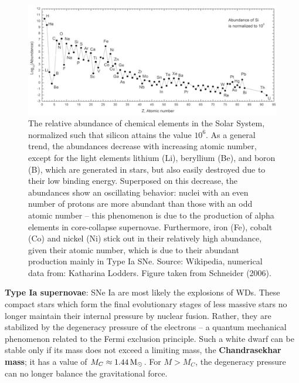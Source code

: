 \documentclass[a4paper,10pt]{article}
\begin{document}
\begin{figure}[t]
    \centering
    \includegraphics[width=12cm]{figures/ChemicalElements.png}
    \caption{\footnotesize{The relative abundance of chemical elements in the Solar System, normalized such that silicon attains the value $10^6$. As a general trend, the abundances decrease with increasing atomic number, except for the light elements lithium (Li), beryllium (Be), and boron (B), which are generated in stars, but also easily destroyed due to their low binding energy. Superposed on this decrease, the abundances show an oscillating behavior: nuclei with an even number of protons are more abundant than those with an odd atomic number -- this phenomenon is due to the production of alpha elements in core-collapse supernovae. Furthermore, iron (Fe), cobalt (Co) and nickel (Ni) stick out in their relatively high abundance, given their atomic number, which is due to their abundant production mainly in Type Ia SNe. Source: Wikipedia, numerical data from: Katharina Lodders. Figure taken from Schneider (2006).}}
    \label{fig:chemicalelements}
\end{figure}

{\noindent}\textbf{Type Ia supernovae}: SNe Ia are most likely the explosions of WDs. These compact stars which form the final evolutionary stages of less massive stars no longer maintain their internal pressure by nuclear fusion. Rather, they are stabilized by the degeneracy pressure of the electrons -- a quantum mechanical phenomenon related to the Fermi exclusion principle. Such a white dwarf can be stable only if its mass does not exceed a limiting mass, the \textbf{Chandrasekhar mass}; it has a value of $M_C\approx1.44\,{\rm M_\odot}$. For $M>M_C$, the degeneracy pressure can no longer balance the gravitational force. 
\end{document}
